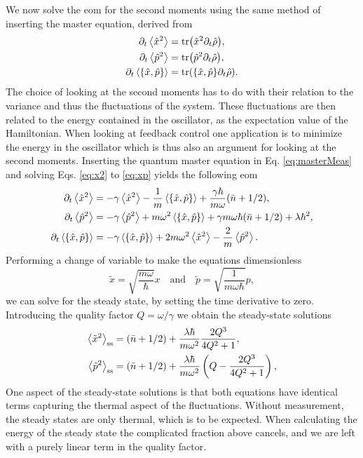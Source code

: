 We now solve the \gls{eom} for the second moments using the same method of inserting the master equation, derived from
\begin{align}
    \dt\expval{\xop^2} &= \tr(\xop^2 \dt \dmatrix)\label{eq:x2}, \\
    \dt\expval{\pop^2} &= \tr(\pop^2 \dt \dmatrix)\label{eq:p2},\\
    \dt\expval{\acomm{\xop}{\pop}} &= \tr(\acomm{\xop}{\pop} \dt \dmatrix). \label{eq:xp}
\end{align}
The choice of looking at the second moments has to do with their relation to the variance and thus the fluctuations of the system. These fluctuations are then related to the energy contained in the oscillator, as the expectation value of the Hamiltonian. When looking at feedback control one application is to minimize the energy in the oscillator which is thus also an argument for looking at the second moments. Inserting the quantum master equation in Eq. \eqref{eq:masterMeas} and solving Eqs. \eqref{eq:x2} to \eqref{eq:xp} yields the following \gls{eom}
\begin{align}
    \dt\expval{\xop^2} &= - \gamma \expval{\xop^2} - \frac{1}{m}\expval{\acomm{\xop}{\pop}} + \frac{\gamma \hbar}{m\omega}(\nbar + 1/2),\\
    \dt\expval{\pop^2} &= -\gamma \expval{\pop^2} + m\omega^2 \expval{\acomm{\xop}{\pop}} + \gamma m \omega\hbar (\nbar + 1/2) + \lambda \hbar^2,\\
    \dt\expval{\acomm{\xop}{\pop}} &= -\gamma \expval{\acomm{\xop}{\pop}} + 2 m \omega^2 \expval{\xop^2} - \frac{2}{m} \expval{\pop^2}.
\end{align}
Performing a change of variable to make the equations dimensionless
\begin{equation}
    \tilde{x} = \sqrt{\frac{m\omega}{\hbar}} x \quad \text{and} \quad \tilde{p} = \sqrt{\frac{1}{m \omega \hbar}} p ,
\end{equation}
we can solve for the steady state, by setting the time derivative to zero. Introducing the quality factor $Q = \omega / \gamma$ we obtain the steady-state solutions
\begin{align}
    \expval{\tilde{x}^2}_\mathrm{ss} &= (\bar{n} + 1/2) + \frac{\lambda \hbar}{m \omega^2} \frac{2 Q^3}{4Q^2 + 1}, \label{eq:x2ss}\\
    \expval{\tilde{p}^2}_\mathrm{ss} &= (\bar{n} + 1/2) + \frac{\lambda \hbar}{m \omega^2} \left( Q - \frac{2Q^3}{4Q^2 + 1} \right) \label{eq:p2ss},
\end{align}
One aspect of the steady-state solutions is that both equations have identical terms capturing the thermal aspect of the fluctuations. Without measurement, the steady states are only thermal, which is to be expected. When calculating the energy of the steady state the complicated fraction above cancels, and we are left with a purely linear term in the quality factor.
